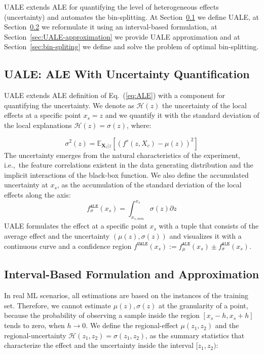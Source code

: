 \documentclass[twoside]{article}
\newcommand{\dfdx}{f^s}
\newcommand{\Xcb}{\mathbf{X}_c}
\begin{document}
UALE extends ALE for quantifying the level of heterogeneous effects
(uncertainty) and automates the bin-splitting. At
Section~\ref{sec:UALE-definition-1} we define UALE, at
Section~\ref{sec:UALE-definition-2} we reformulate it using an
interval-based formulation, at Section~\ref{sec:UALE-approximation} we
provide UALE approximation and at Section~\ref{sec:bin-spliting} we
define and solve the problem of optimal bin-splitting.

\subsection{UALE: ALE With Uncertainty Quantification}
\label{sec:UALE-definition-1}

UALE extends ALE definition of Eq.~(\ref{eq:ALE}) with a component for
quantifying the uncertainty. We denote as \(\mathcal{H}(z)\) the
uncertainty of the local effects at a specific point \(x_s=z\) and we
quantify it with the standard deviation of the local explanations
\(\mathcal{H}(z) = \sigma(z)\), where:

\begin{equation}
  \label{eq:ALE_var}
  \sigma^2(z) = \mathbb{E}_{\Xcb|z}\left [ \left (\dfdx (z, X_c) - \mu(z) \right )^2 \right ] 
\end{equation}
\noindent
The uncertainty emerges from the natural characteristics of the
experiment, i.e.,~the feature correlations existent in the data
generating distribution and the implicit interactions of the black-box
function. We also define the accumulated uncertainty at \(x_s\), as
the accumulation of the standard deviation of the local effects along
the axis:
\begin{equation}
  \label{eq:ALE_acc_unc}
  f^{\mathtt{ALE}}_{\sigma}(x_s) = \int_{x_{s, min}}^{x_s} \sigma(z) \partial z
\end{equation}
\noindent
UALE formulates the effect at a specific point \(x_s\) with a tuple
that consists of the average effect and the uncertainty
\((\mu(z), \sigma(z))\) and visualizes it with a continuous curve and
a confidence region
\(f^{\mathtt{UALE}}(x_s) := f^{\mathtt{ALE}}_{\mu}(x_s) \pm
f^{\mathtt{ALE}}_{\sigma}(x_s)\).

\subsection{Interval-Based Formulation and Approximation}
\label{sec:UALE-definition-2}

In real ML scenarios, all estimations are based on the instances of
the training set. Therefore, we cannot estimate \(\mu(z), \sigma(z)\)
at the granularity of a point, because the probability of observing a
sample inside the region \([x_s - h, x_s + h]\) tends to zero, when
\(h \to 0\). We define the regional-effect \(\mu(z_1, z_2)\) and the
regional-uncertainty \(\mathcal{H}(z_1, z_2) = \sigma(z_1, z_2)\), as
the summary statistics that characterize the effect and the
uncertainty inside the interval \([z_1, z_2)\):
\end{document}

